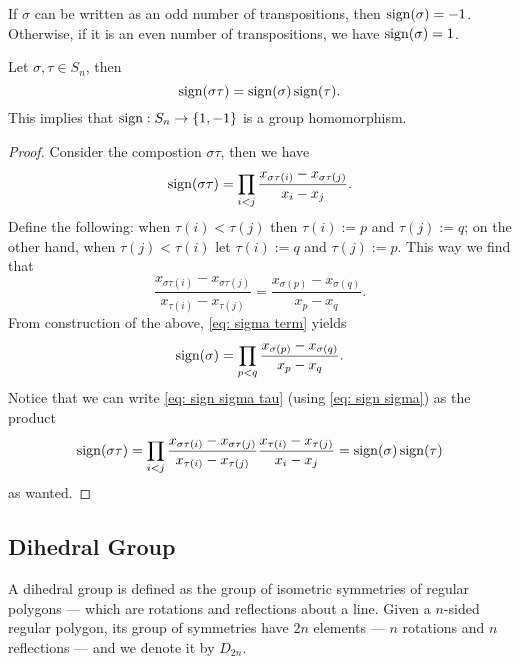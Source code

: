 \begin{corollary}
  If \(\sigma\) can be written as an odd number of transpositions, then
  \(\operatorname{sign}(\sigma) = -1\). Otherwise, if it is an even number of
  transpositions, we have \(\operatorname{sign}(\sigma) = 1\).
\end{corollary}

\begin{proposition}\label{prop: sign is a group homomorphism}
  Let \(\sigma, \tau \in S_n\), then
  \[
    \operatorname{sign}(\sigma \tau) = \operatorname{sign}(\sigma)
    \operatorname{sign}(\tau).
  \]
  This implies that \(\operatorname{sign}: S_n \to \{1, -1\}\) is a
  group homomorphism.
\end{proposition}

\begin{proof}
  Consider the compostion \(\sigma \tau\), then we have
  \begin{equation}\label{eq: sign sigma tau}
     \operatorname{sign}(\sigma \tau) = \prod_{i < j} \frac{x_{\sigma\tau(i)} -
     x_{\sigma\tau(j)}}{x_i - x_j}.
  \end{equation}
  Define the following: when \(\tau(i) < \tau(j)\) then \(\tau(i) := p\) and
  \(\tau(j) := q\); on the other hand, when \(\tau(j) < \tau(i)\) let \(\tau(i)
  := q\) and \(\tau(j) := p\). This way we find that
  \begin{equation}\label{eq: sigma term}
    \frac{x_{\sigma\tau(i)} - x_{\sigma\tau(j)}}{x_{\tau(i)} - x_{\tau(j)}}
    = \frac{x_{\sigma(p)} - x_{\sigma(q)}}{x_p - x_q}.
  \end{equation}
  From construction of the above, \cref{eq: sigma term} yields
  \begin{equation}\label{eq: sign sigma}
    \operatorname{sign}(\sigma) = \prod_{p < q} \frac{x_{\sigma(p)} -
    x_{\sigma(q)}}{x_p - x_q}.
  \end{equation}
  Notice that we can write \cref{eq: sign sigma tau} (using \cref{eq: sign
  sigma}) as the product
  \[
    \operatorname{sign}(\sigma \tau) = \prod_{i < j}
    \frac{x_{\sigma \tau(i)} - x_{\sigma \tau(j)}}{x_{\tau(i)} - x_{\tau(j)}}
    \frac{x_{\tau(i)} - x_{\tau(j)}}{x_i - x_j}
    = \operatorname{sign}(\sigma) \operatorname{sign}(\tau)
  \]
  as wanted.
\end{proof}

\subsection{Dihedral Group}

\begin{definition}\label{def: dihedral}
  A dihedral group is defined as the group of isometric symmetries of regular
  polygons --- which are rotations and reflections about a line. Given a
  \(n\)-sided regular polygon, its group of symmetries have \(2n\) elements ---
  \(n\) rotations and \(n\) reflections --- and we denote it by \(D_{2n}\).
\end{definition}

